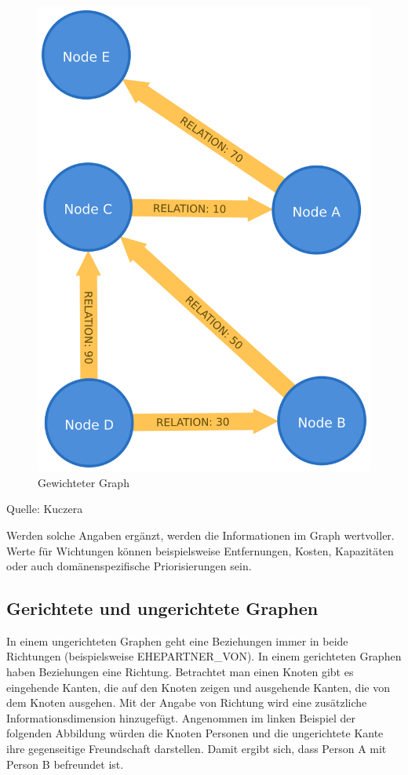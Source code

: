 \documentclass[ngerman,]{scrreprt}
\begin{document}
\begin{figure}
\centering
\includegraphics{Bilder/weightedGraph.png}
\caption{Gewichteter Graph}
\end{figure}

Quelle: Kuczera

Werden solche Angaben ergänzt, werden die Informationen im Graph wertvoller. Werte für Wichtungen können beispielsweise Entfernungen, Kosten, Kapazitäten oder auch domänenspezifische Priorisierungen sein.

\subsection{Gerichtete und ungerichtete Graphen}\label{gerichtete-und-ungerichtete-graphen}

In einem ungerichteten Graphen geht eine Beziehungen immer in beide Richtungen (beispielsweise EHEPARTNER\_VON). In einem gerichteten Graphen haben Beziehungen eine Richtung. Betrachtet man einen Knoten gibt es eingehende Kanten, die auf den Knoten zeigen und ausgehende Kanten, die von dem Knoten ausgehen. Mit der Angabe von Richtung wird eine zusätzliche Informationsdimension hinzugefügt. Angenommen im linken Beispiel der folgenden Abbildung würden die Knoten Personen und die ungerichtete Kante ihre gegenseitige Freundschaft darstellen. Damit ergibt sich, dass Person A mit Person B befreundet ist.
\end{document}

